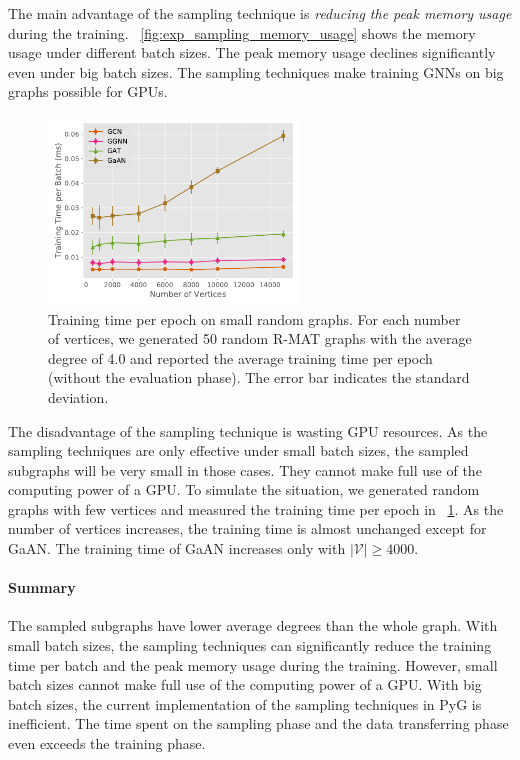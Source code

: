The main advantage of the sampling technique is \emph{reducing the peak memory usage} during the training.
\figurename~\ref{fig:exp_sampling_memory_usage} shows the memory usage under different batch sizes.
The peak memory usage declines significantly even under big batch sizes.
The sampling techniques make training GNNs on big graphs possible for GPUs.

\begin{figure}
    \centering
    \includegraphics[height=5cm]{figs/experiments/exp_small_graph_train_time.pdf}
    \caption{Training time per epoch on small random graphs. For each number of vertices, we generated 50 random R-MAT graphs with the average degree of 4.0 and reported the average training time per epoch (without the evaluation phase). The error bar indicates the standard deviation.}
    \label{fig:exp_small_graph_train_time}
\end{figure}

The disadvantage of the sampling technique is wasting GPU resources.
As the sampling techniques are only effective under small batch sizes, the sampled subgraphs will be very small in those cases.
They cannot make full use of the computing power of a GPU.
To simulate the situation, we generated random graphs with few vertices and measured the training time per epoch in \figurename~\ref{fig:exp_small_graph_train_time}.
As the number of vertices increases, the training time is almost unchanged except for GaAN.
The training time of GaAN increases only with $|\mathcal{V}| \geq 4000$.


\paragraph{Summary}
The sampled subgraphs have lower average degrees than the whole graph.
With small batch sizes, the sampling techniques can significantly reduce the training time per batch and the peak memory usage during the training.
However, small batch sizes cannot make full use of the computing power of a GPU.
With big batch sizes, the current implementation of the sampling techniques in PyG is inefficient.
The time spent on the sampling phase and the data transferring phase even exceeds the training phase.
